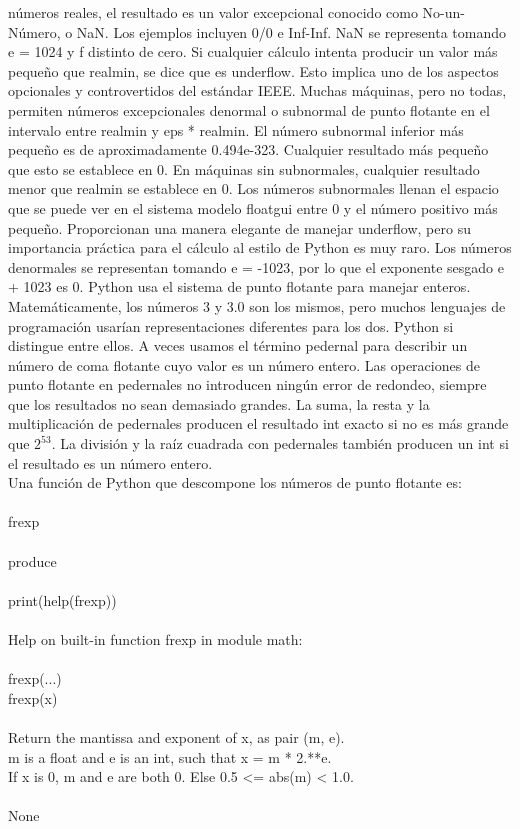 \documentclass[12pt]{article}
\begin{document}
números reales, el resultado es un valor excepcional conocido como No-un-Número, o NaN.
Los ejemplos incluyen 0/0 e Inf-Inf. NaN se representa tomando e = 1024 y f distinto de cero.
Si cualquier cálculo intenta producir un valor más pequeño que realmin, se dice que es
underflow. Esto implica uno de los aspectos opcionales y controvertidos del estándar IEEE.
Muchas máquinas, pero no todas, permiten números excepcionales denormal o subnormal
de punto flotante en el intervalo entre realmin y eps * realmin. El número subnormal inferior
más pequeño es de aproximadamente 0.494e-323. Cualquier resultado más pequeño que
esto se establece en 0. En máquinas sin subnormales, cualquier resultado menor que
realmin se establece en 0. Los números subnormales llenan el espacio que se puede ver en
el sistema modelo floatgui entre 0 y el número positivo más pequeño. Proporcionan una
manera elegante de manejar underflow, pero su importancia práctica para el cálculo al estilo
de Python es muy raro. Los números denormales se representan tomando e = -1023, por lo
que el exponente sesgado e + 1023 es 0.
Python usa el sistema de punto flotante para manejar enteros. Matemáticamente, los
números 3 y 3.0 son los mismos, pero muchos lenguajes de programación usarían
representaciones diferentes para los dos. Python si distingue entre ellos. A veces usamos el
término pedernal para describir un número de coma flotante cuyo valor es un número entero.
Las operaciones de punto flotante en pedernales no introducen ningún error de redondeo,
siempre que los resultados no sean demasiado grandes. La suma, la resta y la multiplicación
de pedernales producen el resultado int exacto si no es más grande que $2^{53}$. La división y la
raíz cuadrada con pedernales también producen un int si el resultado es un número entero.\\
Una funci\'on de Python que descompone los n\'umeros de punto flotante es:\\\\

frexp\\\\

produce\\\\

print(help(frexp))\\\\
Help on built-in function frexp in module math:\\\\
frexp(...)\\
    frexp(x)\\\\    
    Return the mantissa and exponent of x, as pair (m, e).\\
    m is a float and e is an int, such that x = m * 2.**e.\\
    If x is 0, m and e are both 0.  Else 0.5 <= abs(m) < 1.0.\\\\
None\\\\
\end{document}
